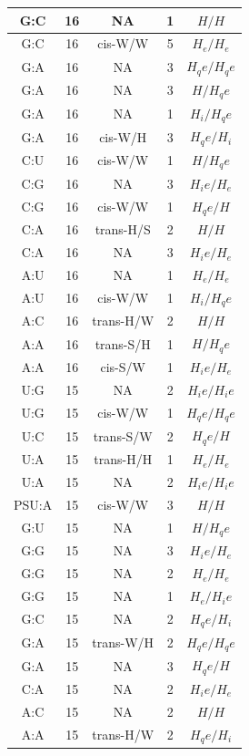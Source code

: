 \begin{center}
\begin{longtable}{c|c|c|c|c}
G:C & 16 & NA & 1 & $H/H$ \\  \hline
G:C & 16 & cis-W/W & 5 & $H_e/H_e$ \\  \hline
G:A & 16 & NA & 3 & $H_qe/H_qe$ \\  \hline
G:A & 16 & NA & 3 & $H/H_qe$ \\  \hline
G:A & 16 & NA & 1 & $H_i/H_qe$ \\  \hline
G:A & 16 & cis-W/H & 3 & $H_qe/H_i$ \\  \hline
C:U & 16 & cis-W/W & 1 & $H/H_qe$ \\  \hline
C:G & 16 & NA & 3 & $H_ie/H_e$ \\  \hline
C:G & 16 & cis-W/W & 1 & $H_qe/H$ \\  \hline
C:A & 16 & trans-H/S & 2 & $H/H$ \\  \hline
C:A & 16 & NA & 3 & $H_ie/H_e$ \\  \hline
A:U & 16 & NA & 1 & $H_e/H_e$ \\  \hline
A:U & 16 & cis-W/W & 1 & $H_i/H_qe$ \\  \hline
A:C & 16 & trans-H/W & 2 & $H/H$ \\  \hline
A:A & 16 & trans-S/H & 1 & $H/H_qe$ \\  \hline
A:A & 16 & cis-S/W & 1 & $H_ie/H_e$ \\  \hline
U:G & 15 & NA & 2 & $H_ie/H_ie$ \\  \hline
U:G & 15 & cis-W/W & 1 & $H_qe/H_qe$ \\  \hline
U:C & 15 & trans-S/W & 2 & $H_qe/H$ \\  \hline
U:A & 15 & trans-H/H & 1 & $H_e/H_e$ \\  \hline
U:A & 15 & NA & 2 & $H_ie/H_ie$ \\  \hline
PSU:A & 15 & cis-W/W & 3 & $H/H$ \\  \hline
G:U & 15 & NA & 1 & $H/H_qe$ \\  \hline
G:G & 15 & NA & 3 & $H_ie/H_e$ \\  \hline
G:G & 15 & NA & 2 & $H_e/H_e$ \\  \hline
G:G & 15 & NA & 1 & $H_e/H_ie$ \\  \hline
G:C & 15 & NA & 2 & $H_qe/H_i$ \\  \hline
G:A & 15 & trans-W/H & 2 & $H_qe/H_qe$ \\  \hline
G:A & 15 & NA & 3 & $H_qe/H$ \\  \hline
C:A & 15 & NA & 2 & $H_ie/H_e$ \\  \hline
A:C & 15 & NA & 2 & $H/H$ \\  \hline
A:A & 15 & trans-H/W & 2 & $H_qe/H_i$ \\  \hline

\end{longtable}
\end{center}
